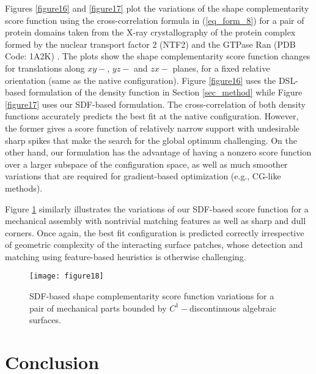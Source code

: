 \documentclass[article]{gmp2014}
\theoremstyle{definition}
\begin{document}
Figures \ref{figure16} and \ref{figure17} plot the variations of the shape complementarity score function using the cross-correlation formula in (\ref{eq_form_8}) for a pair of protein domains taken from the X-ray crystallography of the protein complex formed by the nuclear transport factor 2 (NTF2) and the GTPase Ran (PDB Code: 1A2K) \cite{Stewart1998}. The plots show the shape complementarity score function changes for translations along $xy-$, $yz-$ and $zx-$ planes, for a fixed relative orientation (same as the native configuration). Figure \ref{figure16} uses the DSL-based formulation of the density function in Section \ref{sec_method} while Figure \ref{figure17} uses our SDF-based formulation. The cross-correlation of both density functions accurately predicts the best fit at the native configuration. However, the former gives a score function of relatively narrow support with undesirable sharp spikes that make the search for the global optimum challenging. On the other hand, our formulation has the advantage of having a nonzero score function over a larger subspace of the configuration space, as well as much smoother variations that are required for gradient-based optimization (e.g., CG-like methods).

Figure \ref{figure18} similarly illustrates the variations of our SDF-based score function for a mechanical assembly with nontrivial matching features as well as sharp and dull corners. Once again, the best fit configuration is predicted correctly irrespective of geometric complexity of the interacting surface patches, whose detection and matching using feature-based heuristics is otherwise challenging.

%
\begin{figure}
    \centering
    \texttt{[image: figure18]}
    \caption{SDF-based shape complementarity score function variations for a pair of mechanical parts bounded by $C^1-$discontinuous algebraic surfaces.} \label{figure18}
\end{figure}
%


\section{Conclusion} \label{sec_conclusion}
\end{document}
